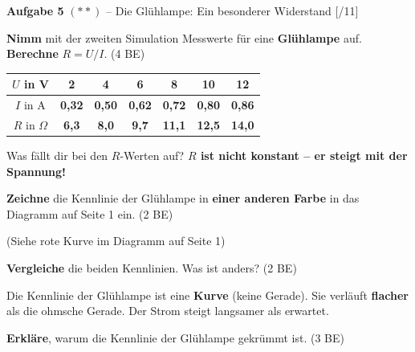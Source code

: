 \documentclass[11pt, a4paper]{article}
\newcommand{\loes}[1]{\textcolor{loesung}{\textbf{#1}}}
\newcommand{\punktebox}[1]{\hfill\small\textcolor{mittelgrau}{[\hspace{0.8em}/#1]}}
\newcommand{\aufgabe}[2]{%
    \needspace{4\baselineskip}%
    \vspace{8pt}%
    \noindent\textbf{\textcolor{fachfarbe}{Aufgabe #1}} #2%
    \vspace{4pt}%
    \nopagebreak[4]%
}
\newcommand{\operator}[1]{\textbf{#1}}
\begin{document}
\newpage


\aufgabe{5}{$(**)$ – Die Glühlampe: Ein besonderer Widerstand} \punktebox{11}

\begin{teil}
    \item \operator{Nimm} mit der zweiten Simulation Messwerte für eine \textbf{Glühlampe} auf. \operator{Berechne} $R = U/I$. \hfill (4 BE)

    \vspace{0.3em}
    \begin{center}
    \small
    \begin{tabular}{|c|c|c|c|c|c|c|}
    \hline
    $U$ in V & 2 & 4 & 6 & 8 & 10 & 12 \\
    \hline
    $I$ in A & \loes{0,32} & \loes{0,50} & \loes{0,62} & \loes{0,72} & \loes{0,80} & \loes{0,86} \\[0.5em]
    \hline
    $R$ in $\Omega$ & \loes{6,3} & \loes{8,0} & \loes{9,7} & \loes{11,1} & \loes{12,5} & \loes{14,0} \\[0.5em]
    \hline
    \end{tabular}
    \end{center}

    \vspace{0.3em}
    Was fällt dir bei den $R$-Werten auf? \loes{$R$ ist nicht konstant – er steigt mit der Spannung!}

    \vspace{0.5em}
    \item \operator{Zeichne} die Kennlinie der Glühlampe in \textbf{einer anderen Farbe} in das Diagramm auf Seite 1 ein. \hfill (2 BE)

    \textcolor{loesung}{(Siehe rote Kurve im Diagramm auf Seite 1)}

    \vspace{0.5em}
    \item \operator{Vergleiche} die beiden Kennlinien. Was ist anders? \hfill (2 BE)

    \textcolor{loesung}{Die Kennlinie der Glühlampe ist eine \textbf{Kurve} (keine Gerade). Sie verläuft \textbf{flacher} als die ohmsche Gerade. Der Strom steigt langsamer als erwartet.}

    \vspace{0.3em}
    \item \operator{Erkläre}, warum die Kennlinie der Glühlampe gekrümmt ist. \hfill (3 BE)


\end{teil}
\end{document}
